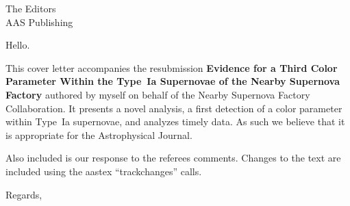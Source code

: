 \documentclass[a4paper,12pt]{letter}
\begin{document}
\begin{letter}{The Editors\\AAS Publishing}

\opening{Hello.} %

This cover letter accompanies the resubmission 
{\bf Evidence for a Third Color  Parameter Within the Type~Ia Supernovae of the Nearby Supernova Factory} authored by myself on behalf
of the Nearby Supernova Factory Collaboration.  It presents a novel analysis, a first detection of a  color parameter within Type~Ia supernovae,
and analyzes timely data.  As such we believe that  it is appropriate for the Astrophysical Journal.

Also included is our response to the referees comments.  Changes to the text are included using the aastex ``trackchanges'' calls.


\closing{Regards,} %


\end{letter}
\end{document}
